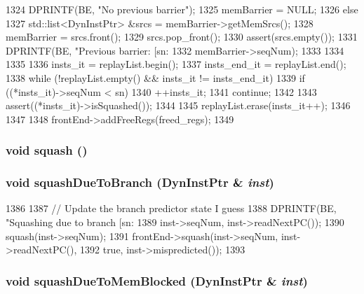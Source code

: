 \begin{DoxyCode}
{{{1324             DPRINTF(BE, "No previous barrier\n");
1325             memBarrier = NULL;
1326         } else {
1327             std::list<DynInstPtr> &srcs = memBarrier->getMemSrcs();
1328             memBarrier = srcs.front();
1329             srcs.pop_front();
1330             assert(srcs.empty());
1331             DPRINTF(BE, "Previous barrier: [sn:%
1332                     memBarrier->seqNum);
1333         }
1334     }
1335 
1336     insts_it = replayList.begin();
1337     insts_end_it = replayList.end();
1338     while (!replayList.empty() && insts_it != insts_end_it) {
1339         if ((*insts_it)->seqNum < sn) {
1340             ++insts_it;
1341             continue;
1342         }
1343         assert((*insts_it)->isSquashed());
1344 
1345         replayList.erase(insts_it++);
1346     }
1347 
1348     frontEnd->addFreeRegs(freed_regs);
1349 }
\end{DoxyCode}
\hypertarget{classLWBackEnd_a3c68c455d9207edd23ae3bcb7971e653}{
\subsubsection[{squash}]{\setlength{\rightskip}{0pt plus 5cm}void squash ()}}
\label{classLWBackEnd_a3c68c455d9207edd23ae3bcb7971e653}
\hypertarget{classLWBackEnd_a05c89a1532adb13cc0632fc3bb600add}{
\subsubsection[{squashDueToBranch}]{\setlength{\rightskip}{0pt plus 5cm}void squashDueToBranch ({\bf DynInstPtr} \& {\em inst})}}
\label{classLWBackEnd_a05c89a1532adb13cc0632fc3bb600add}



\begin{DoxyCode}
1386 {
1387     // Update the branch predictor state I guess
1388     DPRINTF(BE, "Squashing due to branch [sn:%
1389             inst->seqNum, inst->readNextPC());
1390     squash(inst->seqNum);
1391     frontEnd->squash(inst->seqNum, inst->readNextPC(),
1392                      true, inst->mispredicted());
1393 }
\end{DoxyCode}
\hypertarget{classLWBackEnd_a5fcf443dc6ada1ab1936df923c3205d2}{
\subsubsection[{squashDueToMemBlocked}]{\setlength{\rightskip}{0pt plus 5cm}void squashDueToMemBlocked ({\bf DynInstPtr} \& {\em inst})}}
\label{classLWBackEnd_a5fcf443dc6ada1ab1936df923c3205d2}



